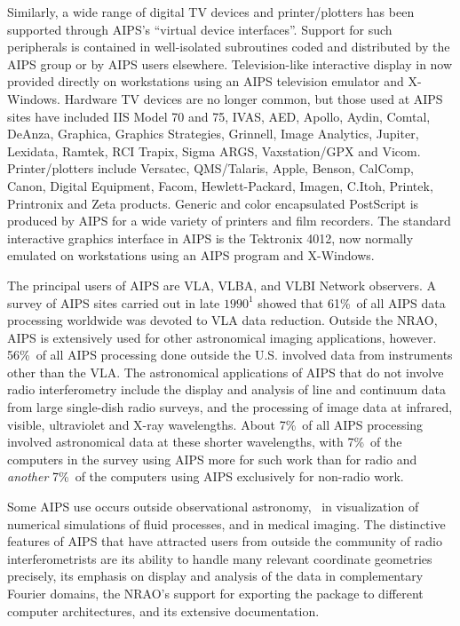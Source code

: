     Similarly, a wide range of digital TV devices and printer/plotters
has been supported through AIPS's ``virtual device interfaces''.
Support for such peripherals is contained in well-isolated subroutines
coded and distributed by the AIPS group or by AIPS users elsewhere.
Television-like interactive display in now provided directly on
workstations using an AIPS television emulator and X-Windows.  Hardware
TV devices are no longer common, but those used at AIPS sites have
included IIS Model 70 and 75, IVAS, AED, Apollo, Aydin, Comtal,
DeAnza, Graphica, Graphics Strategies, Grinnell, Image Analytics,
Jupiter, Lexidata, Ramtek, RCI Trapix, Sigma ARGS, Vaxstation/GPX and
Vicom.   Printer/plotters include Versatec, QMS/Talaris, Apple,
Benson, CalComp, Canon, Digital Equipment, Facom, Hewlett-Packard,
Imagen, C.Itoh, Printek, Printronix and Zeta products.  Generic and
color encapsulated PostScript is produced by AIPS for a wide variety
of printers and film recorders.  The standard interactive graphics
interface in AIPS is the Tektronix 4012, now normally emulated on
workstations using an AIPS program and X-Windows.

    The principal users of AIPS are VLA, VLBA, and VLBI Network
observers.  A survey of AIPS sites carried out in late $1990^1$
showed that 61\%\ of all AIPS data processing worldwide was devoted to
VLA data reduction.  Outside the NRAO, AIPS is extensively used for
other astronomical imaging applications, however.  56\%\ of all AIPS
processing done outside the U.S. involved data from instruments other
than the \hbox{VLA}.  The astronomical applications of AIPS that do
not involve radio interferometry include the display and analysis of
line and continuum data from large single-dish radio surveys, and the
processing of image data at infrared, visible, ultraviolet and X-ray
wavelengths.  About 7\%\ of all AIPS processing involved astronomical
data at these shorter wavelengths, with 7\%\ of the computers in the
survey using AIPS more for such work than for radio and {\it another}
7\%\ of the computers using AIPS exclusively for non-radio work.

    Some AIPS use occurs outside observational astronomy, \eg\ in
visualization of numerical simulations of fluid processes, and in
medical imaging.  The distinctive features of AIPS that have attracted
users from outside the community of radio interferometrists are its
ability to handle many relevant coordinate geometries precisely, its
emphasis on display and analysis of the data in complementary Fourier
domains, the NRAO's support for exporting the package to different
computer architectures, and its extensive documentation.

